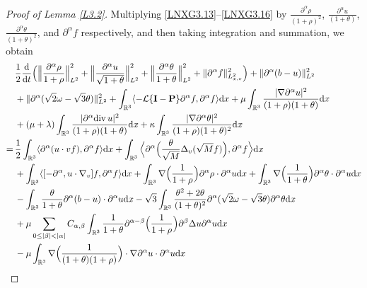 \documentclass[reqno,11pt]{amsart}
\theoremstyle{plain}
\numberwithin{equation}{section}
\begin{document}
\begin{proof}[Proof of Lemma \ref{L3.2}]
 Multiplying \eqref{LNXG3.13}--\eqref{LNXG3.16} by $\frac{\partial^\alpha\rho}{(1+\rho)^2}$, $\frac{\partial^\alpha u}{(1+\theta) }$, $\frac{\partial^\alpha\theta}{(1+\theta)^2 }$, and $\partial^\alpha f$ respectively, and then taking integration and summation, we obtain 
\begin{align}\label{G3.10}
&\frac{1}{2}\frac{{\rm d}}{{\rm d}t}   \Big(\Big\|\frac{\partial^\alpha\rho}{1+\rho}\Big\|_{L^2}^2+\Big\|\frac{\partial^\alpha u}{\sqrt{1+\theta}}\Big\|_{L^2}^{2}+\Big\|\frac{\partial^\alpha\theta}{1+\theta}\Big\|_{L^2}^2 +\|\partial^\alpha f\|_{L_{x,v}^{2}}^2\Big) +\|\partial^\alpha(b-u)\|_{L^2}^{2}\nonumber\\
&+\|\partial^\alpha(\sqrt{2}\omega-\sqrt{3}\theta)\|_{L^2}^2 +\int_{\mathbb{R}^3} \langle-\mathcal{L}\{\mathbf{I}-\mathbf{P}\}\partial^\alpha f,\partial^\alpha f\rangle {\rm d}x+\mu \int_{\mathbb{R}^3}\frac{|\nabla\partial^\alpha u|^2}{(1+\rho)(1+\theta)} {\rm d}x  \nonumber\\
&+(\mu +\lambda) \int_{\mathbb{R}^3}\frac{| \partial^\alpha{\rm div}\, u|^2}{(1+\rho)(1+\theta)} {\rm d}x+\kappa\int_{\mathbb{R}^3}\frac{| \nabla\partial^\alpha  \theta|^2}{(1+\rho)(1+\theta)^2} {\rm d}x   \nonumber\\
=\,& \frac{1}{2}\int_{\mathbb{R}^3}\langle \partial^\alpha(u\cdot vf),\partial^\alpha f\rangle{\rm d}x+\int_{\mathbb{R}^3}\Big\langle\partial^\alpha\Big(\frac{\theta}{\sqrt{M}}\Delta_v(\sqrt{M}f)\Big),\partial^\alpha f\Big\rangle{\rm d}x\nonumber\\
&+\int_{\mathbb{R}^3}\langle [-\partial^\alpha,u\cdot\nabla_v ]f    ,\partial^\alpha f\rangle {\rm d}x+\int_{\mathbb{R}^3}\nabla\Big( \frac{1}{1+\rho}\Big)  \partial^\alpha\rho\cdot\partial^\alpha u{\rm d}x+\int_{\mathbb{R}^3}\nabla\Big( \frac{1}{1+\theta}\Big)  \partial^\alpha\theta\cdot\partial^\alpha u{\rm d}x\nonumber\\
&-\int_{\mathbb{R}^3} \frac{\theta}{1+\theta}\partial^\alpha (b-u)\cdot\partial^\alpha u {\rm d}x-\sqrt{3}\int_{\mathbb{R}^3} \frac{\theta^2+2\theta}{(1+\theta)^2}\partial^\alpha (\sqrt{2}\omega-\sqrt{3}\theta) \partial^\alpha \theta {\rm d}x\nonumber\\
&+\mu\sum_{0\leq|\beta|<|\alpha|} C_{\alpha,\beta}\int_{\mathbb{R}^3}\frac{1}{1+\theta}\partial^{\alpha-\beta}\Big( \frac{1}{1+\rho} \Big)\partial^\beta\Delta u\partial^\alpha u {\rm d}x\nonumber\\
&-\mu\int_{\mathbb{R}^3} \nabla\Big(\frac{1}{(1+\theta)(1+\rho)} \Big)\cdot\nabla\partial^\alpha u \cdot \partial^\alpha u {\rm d}x \nonumber\\

\end{align}
\end{proof}
\end{document}
